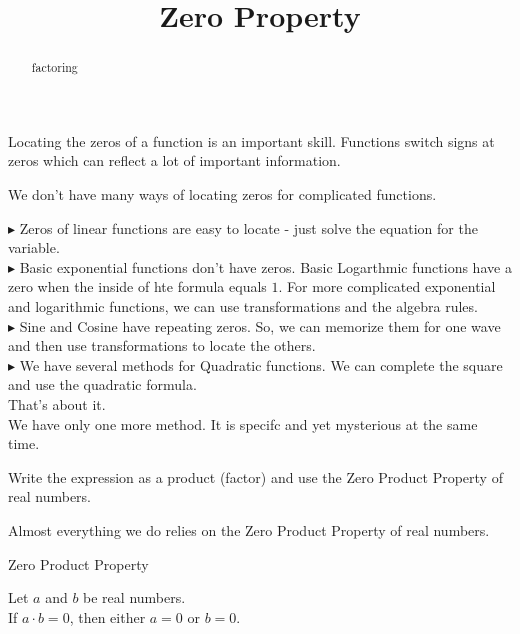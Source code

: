 \documentclass{ximera}
\title{Zero Property}
\begin{document}
\begin{abstract}
factoring
\end{abstract}
\maketitle




Locating the zeros of a function is an important skill.  Functions switch signs at zeros which can reflect a lot of important information.

We don't have many ways of locating zeros for complicated functions.


$\blacktriangleright$ Zeros of linear functions are easy to locate - just solve the equation for the variable. \\


$\blacktriangleright$ Basic exponential functions don't have zeros.  Basic Logarthmic functions have a zero when the inside of hte formula equals $1$. For more complicated exponential and logarithmic functions, we can use transformations and the algebra rules. \\

$\blacktriangleright$ Sine and Cosine have repeating zeros. So, we can memorize them for one wave and then use transformations to locate the others. \\

$\blacktriangleright$ We have several methods for Quadratic functions.  We can complete the square and use the quadratic formula. \\

That's about it. \\

We have only one more method.  It is specifc and yet mysterious at the same time.



\begin{center}
Write the expression as a product (factor) and use the Zero Product Property of real numbers.
\end{center}



Almost everything we do relies on the Zero Product Property of real numbers. \\


\begin{definition} Zero Product Property

Let $a$ and $b$ be real numbers. \\

If $a \cdot b = 0$, then either $a=0$ or $b=0$.


\end{definition}
\end{document}
